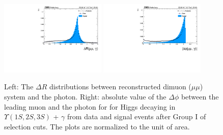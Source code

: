 \begin{figure}[!htbp]
\begin{center}
\includegraphics[width=0.45\textwidth]{figures_and_tables/outputPlots/HtoUpsilon_Cat0_ZZZZZ/au/data_x_mc/noKinCuts/h_noKin_deltaR_Upsilon_Photon}\hspace*{1.cm}
\includegraphics[width=0.45\textwidth]{figures_and_tables/outputPlots/HtoUpsilon_Cat0_ZZZZZ/au/data_x_mc/noKinCuts/h_noKin_deltaPhi_Upsilon_Photon}\end{center}\vspace*{-.5cm}
\caption{Left: The $\Delta R$ distributions between reconstructed dimuon ($\mu\mu$) system and the photon. Right: absolute value of the $\Delta \phi$ between the leading muon and the photon for for Higgs decaying in $\Upsilon(1S,2S,3S)$ + $\gamma$ from data and signal events after Group I of selection cuts. The plots are normalized to the unit of area.}
\label{fig:deltaRdeltaPhi_ZtoUpsilon_Cat0}
\end{figure}

